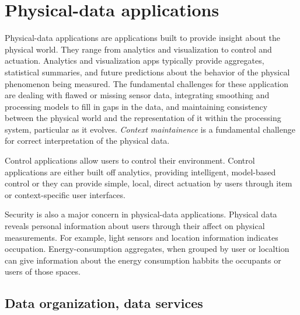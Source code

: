 \documentclass[10pt,print,letterpaper]{sigplan-proc-varsize}
\begin{document}
% 




% 

%
%

\section{Physical-data applications}
Physical-data applications are applications built to provide insight about the physical world.  They range from
analytics and visualization to control and actuation.  Analytics and visualization apps typically 
provide aggregates, statistical summaries, and future predictions about the behavior of the physical phenomenon 
being measured.  The fundamental challenges for these application are dealing with flawed or missing sensor data,
integrating smoothing and processing models to fill in gaps in the data, and maintaining consistency
between the physical world and the representation of it within the processing system, particular as it evolves.  
\emph{Context maintainence} is a fundamental challenge for correct interpretation of the physical data.

Control applications allow users to control their environment.  Control applications are either built off
analytics, providing intelligent, model-based control or they can provide simple, local, direct actuation by users 
through item or context-specific user interfaces.

Security is also a major concern in physical-data applications.  Physical data reveals personal information
about users through their affect on physical measurements.  For example, light sensors and location information
indicates occupation.  Energy-consumption aggregates, when grouped by user or localtion can give information about
the energy consumption habbits the occupants or users of those spaces.

\subsection{Data organization, data services}
\end{document}
